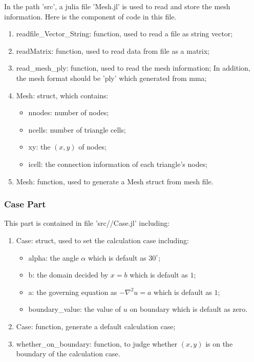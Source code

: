 In the path 'src', a julia file 'Mesh.jl' is used to read and store the mesh information. 
Here is the component of code in this file.
\begin{enumerate}
    \item readfile\_Vector\_String: function, used to read a file as string vector;
    \item readMatrix: function, used to read data from file as a matrix;
    \item read\_mesh\_ply: function, used to read the mesh information; In addition, the mesh format should be 'ply' which generated from mma;
    \item Mesh: struct, which contains:
    \begin{itemize}
        \item nnodes: number of nodes;
        \item ncells: number of triangle cells;
        \item xy: the $(x,y)$ of nodes;
        \item icell: the connection information of each triangle's nodes;
    \end{itemize}
    \item Mesh: function, used to generate a Mesh struct from mesh file.
\end{enumerate}

\subsubsection{Case Part}

This part is contained in file 'src//Case.jl' including:
\begin{enumerate}
    \item Case: struct, used to set the calculation case including:
    \begin{itemize}
        \item alpha: the angle $\alpha$ which is default as $30^\circ$;
        \item b: the domain decided by $x=b$ which is default as $1$;
        \item a: the governing equation as $-\nabla^2 u = a$ which is default as $1$;
        \item boundary\_value: the value of $u$ on boundary which is default as zero.
    \end{itemize}
    \item Case: function, generate a default calculation case;
    \item whether\_on\_boundary: function, to judge whether $(x,y)$ is on the boundary of the calculation case.
\end{enumerate}


